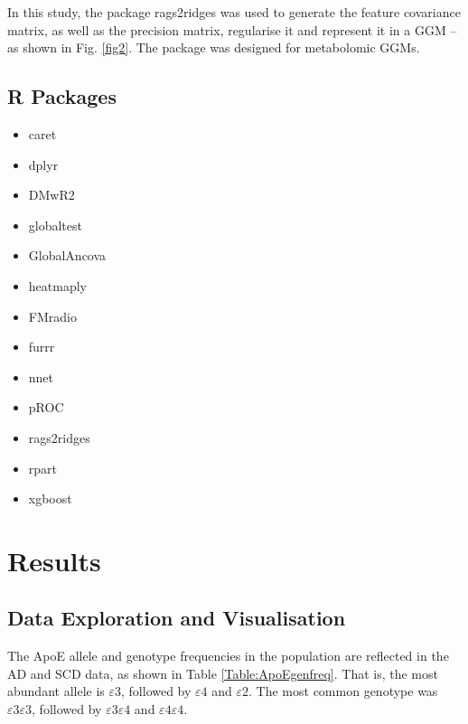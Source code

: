 \documentclass{amsart}
\theoremstyle{plain}
\begin{document}
In this study, the package \textsf{rags2ridges} \cite{Peeters2022Rags2ridges:Matrices} was used to generate the feature covariance matrix, as well as the precision matrix, regularise it and represent it in a GGM --as shown in Fig. \ref{fig2}. The package was designed for metabolomic GGMs.

\clearpage
\subsection{R Packages}
\hspace{5 pt}
\begin{multicols}{3}
\begin{itemize}
    \item[] \textsf{caret} \cite{Kuhn2008BuildingPackage}
    \item[]\textsf{dplyr} \cite{dplyr}
    \item[]\textsf{DMwR2} \cite{DMwR2}
    \item[]\textsf{globaltest} \cite{Goeman2004AOutcome, Goeman2006TestingAlternative, Goeman2023ThePackage}
    \item[]\textsf{GlobalAncova} \cite{Mansmann2005TestingApproach, Hummel2008GlobalANCOVA:Effects, Hummel2023GlobalExpression}
    \item[]\textsf{heatmaply} \cite{heatmaply}
    \item[]\textsf{FMradio} \cite{Peeters2019StableData}
    \item[]\textsf{furrr}
    \item[]\textsf{nnet} \cite{nnet}
    \item[]\textsf{pROC} \cite{pROC}
    \item[]\textsf{rags2ridges} \cite{Peeters2022Rags2ridges:Matrices}
    \item[]\textsf{rpart} \cite{rpart}
    \item[]\textsf{xgboost} \cite{Chen2016XGBoost:System}
\end{itemize}
\end{multicols}

\clearpage
\section{Results}

\subsection{Data Exploration and Visualisation}
The ApoE allele and genotype frequencies in the population are reflected in the AD and SCD data, as shown in Table \ref{Table:ApoEgenfreq}. That is, the most abundant allele is $\varepsilon$3, followed by $\varepsilon4$ and $\varepsilon2$. The most common genotype was $\varepsilon3\varepsilon3$, followed by $\varepsilon3\varepsilon4$ and $\varepsilon4\varepsilon4$.
\end{document}
